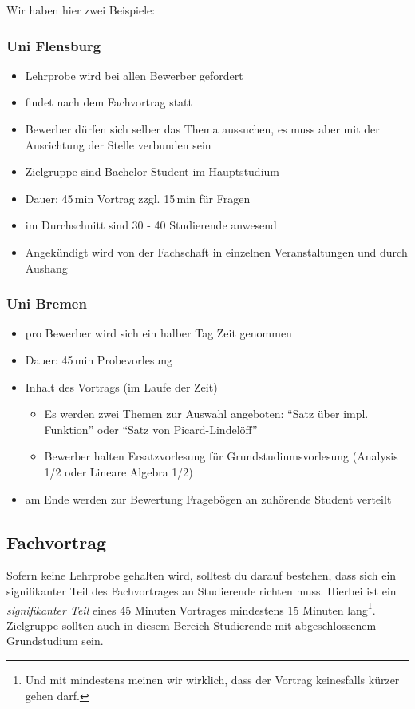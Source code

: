 Wir haben hier zwei Beispiele:

\subsubsection{Uni Flensburg}
\begin{itemize}
    \item Lehrprobe wird bei allen Bewerber gefordert
    \item findet nach dem Fachvortrag statt
    \item Bewerber dürfen sich selber das Thema aussuchen, es muss aber mit der Ausrichtung der Stelle verbunden sein
    \item Zielgruppe sind Bachelor-Student im Hauptstudium
    \item Dauer: 45\,min Vortrag zzgl. 15\,min für Fragen
    \item im Durchschnitt sind 30 - 40 Studierende anwesend
    \item Angekündigt wird von der Fachschaft in einzelnen Veranstaltungen und durch Aushang
\end{itemize}

\subsubsection{Uni Bremen}
\begin{itemize}
    \item pro Bewerber wird sich ein halber Tag Zeit genommen
    \item Dauer: 45\,min Probevorlesung
    \item Inhalt des Vortrags (im Laufe der Zeit)
          \begin{itemize}
              \item Es werden zwei Themen zur Auswahl angeboten: "`Satz über impl. Funktion"' oder "`Satz von Picard-Lindelöff"'
              \item Bewerber halten Ersatzvorlesung für Grundstudiumsvorlesung (Analysis 1/2 oder Lineare Algebra 1/2)
          \end{itemize}
    \item am Ende werden zur Bewertung Fragebögen an zuhörende Student verteilt
\end{itemize}


\subsection{Fachvortrag}
Sofern keine Lehrprobe gehalten wird, solltest du darauf bestehen, dass sich ein signifikanter Teil des Fachvortrages an Studierende richten muss. Hierbei ist ein \emph{signifikanter Teil} eines 45 Minuten Vortrages mindestens 15 Minuten lang\footnote{Und mit mindestens meinen wir wirklich, dass der Vortrag keinesfalls kürzer gehen darf.}. Zielgruppe sollten auch in diesem Bereich Studierende mit abgeschlossenem Grundstudium sein.

